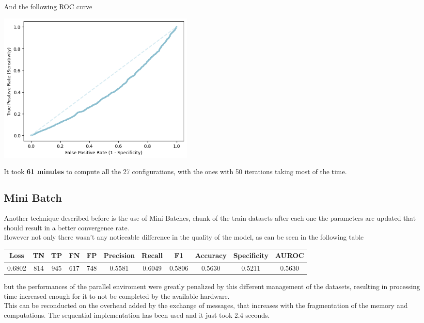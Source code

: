 \documentclass[
	letterpaper, %
	10pt, %
]{class}
\begin{document}
And the following ROC curve

\begin{center}
    \includegraphics[width=10cm]{../images/parallel_roc.png}
\end{center}

It took \textbf{61 minutes} to compute all the 27 configurations, with the ones with 50 iterations taking most of the time.

\subsection{Mini Batch}

Another technique described before is the use of Mini Batches, chunk of the train datasets after each one the parameters are updated that should result in a better convergence rate.\\
However not only there wasn't any noticeable difference in the quality of the model, as can be seen in the following table

\begin{center}
    \begin{tabular}{ c|c|c|c|c|c|c|c|c|c|c| }
        \hline
        Loss   & TN  & TP  & FN  & FP  & Precision & Recall & F1     & Accuracy & Specificity & AUROC  \\
        \hline
        0.6802 & 814 & 945 & 617 & 748 & 0.5581    & 0.6049 & 0.5806 & 0.5630   & 0.5211      & 0.5630 \\
        \hline
    \end{tabular}
\end{center}

but the performances of the parallel enviroment were greatly penalized by this different management of the datasets, resulting in processing time increased enough for it to not be completed by the available hardware.\\
This can be reconducted on the overhead added by the exchange of messages, that increases with the fragmentation of the memory and computations.
The sequential implementation has been used and it just took 2.4 seconds.
\end{document}
